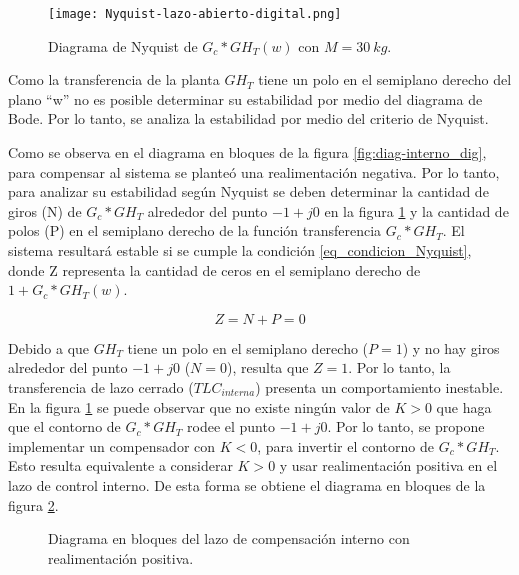 \begin{figure}[H]
	\centering
	\texttt{[image: Nyquist-lazo-abierto-digital.png]}
	\caption{Diagrama de Nyquist de $G_c*GH_{T}(w)$ con $M=30\:kg$.}
	\label{fig:nyquist-lazo-abierto-digital}
\end{figure}

Como la transferencia de la planta $GH_T$ tiene un polo en el semiplano derecho del plano ``w'' no es posible determinar su estabilidad por medio del diagrama de Bode. Por lo tanto, se analiza la estabilidad por medio del criterio de Nyquist.

Como se observa en el diagrama en bloques de la figura \ref{fig:diag-interno_dig}, para compensar al sistema se planteó una realimentación negativa. Por lo tanto, para analizar su estabilidad según Nyquist se deben determinar la cantidad de giros (N) de $G_c*GH_T$ alrededor del punto $-1+j0$ en la figura \ref{fig:nyquist-lazo-abierto-digital} y la cantidad de polos (P) en el semiplano derecho de la función transferencia $G_c*GH_T$. El sistema resultará estable si se cumple la condición \ref{eq_condicion_Nyquist}, donde Z representa la cantidad de ceros en el semiplano derecho de $1+G_c*GH_T(w)$.

\begin{equation}\label{eq_condicion_Nyquist}
	Z=N+P=0
\end{equation}


Debido a que $GH_T$ tiene un polo en el semiplano derecho ($P=1$) y no hay giros alrededor del punto $-1+j0$ ($N=0$), resulta que $Z=1$. Por lo tanto, la transferencia de lazo cerrado ($TLC_{interna}$) presenta un comportamiento inestable. En la figura \ref{fig:nyquist-lazo-abierto-digital} se puede observar que no existe ningún valor de $K>0$ que haga que el contorno de $G_c*GH_T$ rodee el punto $-1+j0$. Por lo tanto, se propone implementar un compensador con $K<0$, para invertir el contorno de $G_c*GH_T$. Esto resulta equivalente a considerar $K>0$ y usar realimentación positiva en el lazo de control interno. De esta forma se obtiene el diagrama en bloques de la figura \ref{fig:diag-interno_dig_realimentacion_positiva}.


\begin{figure}[H]
	\centering
	
	\caption{Diagrama en bloques del lazo de compensación interno con realimentación positiva.}	\label{fig:diag-interno_dig_realimentacion_positiva}
\end{figure}

